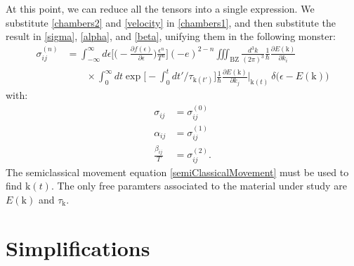 \documentclass[notitlepage,11pt,nofootinbib]{revtex4-1}
\renewcommand{\vec}[1]{\bm{\mathrm{#1}}}
\begin{document}
\begin{tcolorbox}[colback=black!2!white,colframe=white!10!black,title=All-in-one equation]
At this point, we can reduce all the tensors into a single expression. We substitute \eqref{chambers2} and \eqref{velocity} in \eqref{chambers1}, and then substitute the result in \eqref{sigma}, \eqref{alpha}, and \eqref{beta}, unifying them in the following monster:
\begin{align}
\sigma_{ij}^{(n)}
&=
\int_{-\infty}^{\infty}d\epsilon
\bigg[\Big(-\frac{\partial f(\epsilon)}{\partial \epsilon}\Big)\frac{\epsilon^{n}}{T^{n}}\bigg]
(-e)^{2-n}\iiint_{\text{BZ}}\frac{d^3k}{(2\pi)^3}
\frac{1}{\hbar}\frac{\partial E(\vec k)}{\partial k_i} %
\nonumber\\
&\qquad\times
\int_{0}^{\infty}dt
\exp\Big[
-\int_{0}^{t}dt'/\tau_{\vec k(t')}
\Big]
\frac{1}{\hbar}\frac{\partial E(\vec k)}{\partial k_j}\Big|_{\vec k(t)} %
\ \delta\big(\epsilon-E(\vec k)\big)
\label{chambers}
\end{align}
with:
\begin{align}
\sigma_{ij}&=\sigma_{ij}^{(0)}\\
\alpha_{ij}&=\sigma_{ij}^{(1)}\\
\frac{\beta_{ij}}{T}&=\sigma_{ij}^{(2)}.
\end{align}
The semiclassical movement equation \eqref{semiClassicalMovement} must be used to find $\vec k(t)$. The only free paramters associated to the material under study are $E(\vec k)$ and $\tau_{\vec k}$. 
\end{tcolorbox}






\section{Simplifications}
\end{document}
